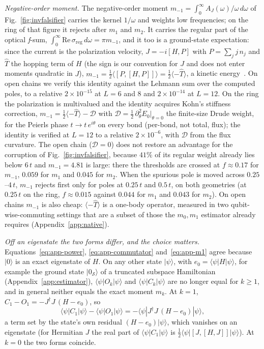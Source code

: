 \documentclass[submission, PhysCore]{SciPost}
\begin{document}
\begin{appendix}
\emph{Negative-order moment.} The negative-order moment ${m_{-1}=\int_0^\infty A_J(\omega)/\omega\,d\omega}$ of Fig.~\ref{fig:invfalsifier} carries the kernel $1/\omega$ and weights low frequencies; on the ring of that figure it rejects after $m_1$ and $m_2$. It carries the regular part of the optical \textit{f}-sum, $\int_0^\infty\!\mathrm{Re}\,\sigma_{\mathrm{reg}}\,d\omega=\pi m_{-1}$, and it too is a ground-state expectation: since the current is the polarization velocity, $J=-i[H,P]$ with $P=\sum_j j\,n_j$ and $\hat T$ the hopping term of $H$ (the sign is our convention for $J$ and does not enter moments quadratic in $J$), $m_{-1}=\tfrac12\langle[P,[H,P]]\rangle=\tfrac{1}{2}\langle-\hat T\rangle$, a kinetic energy~\cite{Kohn1964,Maldague1977,HohenbergMartin1965}. On open chains we verify this identity against the Lehmann sum over the computed poles, to a relative $2\times10^{-15}$ at $L=6$ and $8$ and $2\times10^{-14}$ at $L=12$. On the ring the polarization is multivalued and the identity acquires Kohn's stiffness correction, $m_{-1}=\tfrac12\langle-\hat T\rangle-\mathcal D$ with $\mathcal D=\tfrac12\,\partial^2_\theta E_0|_{\theta=0}$ the finite-size Drude weight, for the Peierls phase $t\to t\,e^{i\theta}$ on every bond (per-bond, not total, flux); the identity is verified at $L=12$ to a relative $2\times10^{-6}$, with $\mathcal D$ from the flux curvature. The open chain ($\mathcal D=0$) does not restore an advantage for the corruption of Fig.~\ref{fig:invfalsifier}, because $41\%$ of its regular weight already lies below $6\,t$ and $m_{-1}=4.81$ is large: there the thresholds are crossed at $f\approx0.17$ for $m_{-1}$, $0.059$ for $m_1$ and $0.045$ for $m_2$. When the spurious pole is moved across $0.25$--$4\,t$, $m_{-1}$ rejects first only for poles at $0.25\,t$ and $0.5\,t$, on both geometries (at $0.25\,t$ on the ring, $f\approx0.015$ against $0.044$ for $m_1$ and $0.043$ for $m_2$). On open chains $m_{-1}$ is also cheap: $\langle-\hat T\rangle$ is a one-body operator, measured in two qubit-wise-commuting settings that are a subset of those the $m_0,m_1$ estimator already requires (Appendix~\ref{app:native}).

\emph{Off an eigenstate the two forms differ, and the choice matters.} Equations~\eqref{eq:app-power}, \eqref{eq:app-commutator} and~\eqref{eq:app-m1} agree because $|0\rangle$ is an exact eigenstate of $H$. On any other state $|\psi\rangle$, with ${e_0=\langle\psi|H|\psi\rangle}$, for example the ground state $|0_\mathcal{S}\rangle$ of a truncated subspace Hamiltonian (Appendix~\ref{app:estimator}), $\langle\psi|O_k|\psi\rangle$ and $\langle\psi|C_k|\psi\rangle$ are no longer equal for $k\ge1$, and in general neither equals the exact moment $m_k$. At $k=1$, $C_1-O_1=-J^\dagger J\,(H-e_0)$, so
\[
\langle\psi|C_1|\psi\rangle-\langle\psi|O_1|\psi\rangle=-\langle\psi|J^\dagger J\,(H-e_0)|\psi\rangle ,
\]
a term set by the state's own residual $(H-e_0)|\psi\rangle$, which vanishes on an eigenstate (for Hermitian $J$ the real part of $\langle\psi|C_1|\psi\rangle$ is $\tfrac12\langle\psi|[J,[H,J]]|\psi\rangle$). At $k=0$ the two forms coincide.


\end{appendix}
\end{document}
